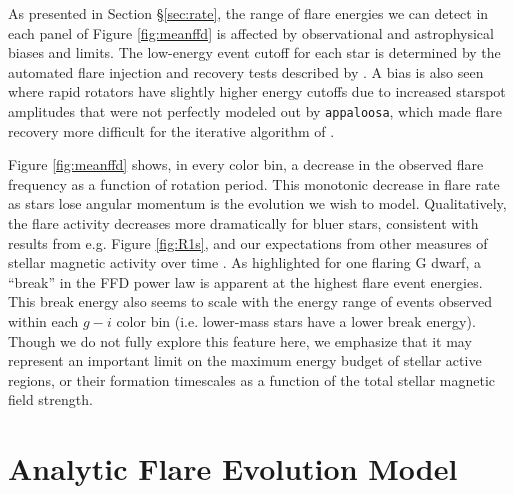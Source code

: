 \documentclass[preprint2]{aastex62}
\begin{document}
As presented in Section \S\ref{sec:rate}, the range of flare energies we can detect in each panel of Figure \ref{fig:meanffd} is affected by observational and astrophysical biases and limits.
The low-energy event cutoff for each star is determined by the automated flare injection and recovery tests described by \citet{davenport2016}. A bias is also seen where rapid rotators have slightly higher energy cutoffs due to increased starspot amplitudes that were not perfectly modeled out by {\tt appaloosa}, which made flare recovery more difficult for the iterative algorithm of \citet{davenport2016}.



Figure \ref{fig:meanffd} shows, in every color bin, a decrease in the observed flare frequency as a function of rotation period. This monotonic decrease in flare rate as stars lose angular momentum is the evolution we wish to model. Qualitatively, the flare activity decreases more dramatically for bluer stars, consistent with results from e.g. Figure \ref{fig:R1s}, and our expectations from other measures of stellar magnetic activity over time \citep[e.g.][]{shkolnik2014,nunez2017}. As \citet{davenport2016} highlighted for one flaring G dwarf, a ``break'' in the FFD power law is apparent at the highest flare event energies. This break energy also seems to scale with the energy range of events observed within each $g-i$ color bin (i.e. lower-mass stars have a lower break energy). Though we do not fully explore this feature here, we emphasize that it may represent an important limit on the maximum energy budget of stellar active regions, or their formation timescales as a function of the total stellar magnetic field strength.


\section{Analytic Flare Evolution Model}
\label{sec:ffdmodel}
\end{document}

